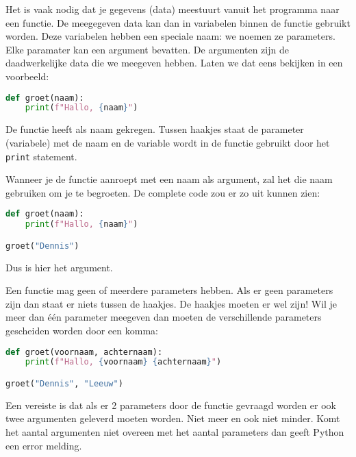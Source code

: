 Het is vaak nodig dat je gegevens (data) meestuurt vanuit het programma naar een functie. De meegegeven data kan dan in variabelen binnen de functie gebruikt worden. Deze variabelen hebben een speciale naam: we noemen ze parameters. Elke paramater kan een argument bevatten. De argumenten zijn de daadwerkelijke data die we meegeven hebben. Laten we dat eens bekijken in een voorbeeld:
\begin{lstlisting}[language=python]
def groet(naam):
    print(f"Hallo, {naam}")
\end{lstlisting}
De functie heeft als naam  gekregen. Tussen haakjes staat de parameter (variabele) met de naam  en de variable wordt in de functie gebruikt door het \texttt{print} statement.

Wanneer je de functie  aanroept met een naam als argument, zal het die naam gebruiken om je te begroeten. De complete code zou er zo uit kunnen zien:
\begin{lstlisting}[language=python]
def groet(naam):
    print(f"Hallo, {naam}")

groet("Dennis")
\end{lstlisting}
Dus  is hier het argument.

Een functie mag geen of meerdere parameters hebben. Als er geen parameters zijn dan staat er niets tussen de haakjes. De haakjes moeten er wel zijn! Wil je meer dan \'e\'en parameter meegeven dan moeten de verschillende parameters gescheiden worden door een komma:
\begin{lstlisting}[language=python]
def groet(voornaam, achternaam):
    print(f"Hallo, {voornaam} {achternaam}")

groet("Dennis", "Leeuw")
\end{lstlisting}

Een vereiste is dat als er 2 parameters door de functie gevraagd worden er ook twee argumenten geleverd moeten worden. Niet meer en ook niet minder. Komt het aantal argumenten niet overeen met het aantal parameters dan geeft Python een error melding.

